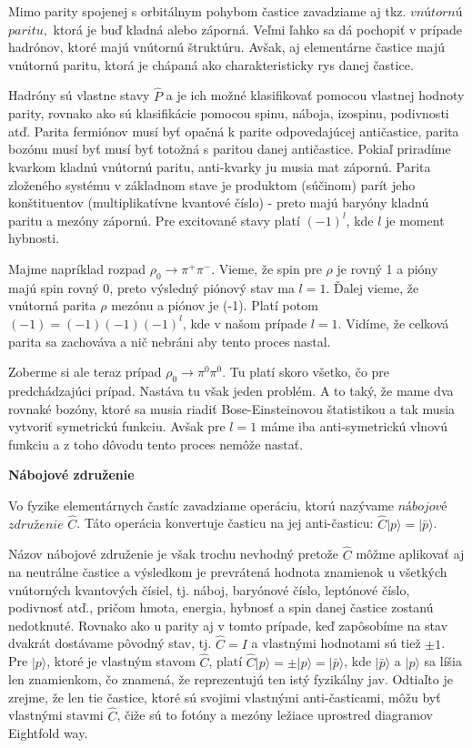 \documentclass[../../main.tex]{subfiles}
\begin{document}
Mimo parity spojenej s orbitálnym pohybom častice zavadziame aj tkz. $vnútornú$ $paritu,$ ktorá je buď kladná alebo záporná. Veľmi ľahko sa dá pochopiť v prípade hadrónov, ktoré majú vnútornú štruktúru. Avšak, aj elementárne častice majú vnútornú paritu, ktorá je chápaná ako charakteristicky rys danej častice.

Hadróny sú vlastne stavy $\hat{P}$ a je ich možné klasifikovať pomocou vlastnej hodnoty parity, rovnako ako sú klasifikácie pomocou spinu, náboja, izospinu, podivnosti atď. Parita fermiónov musí byť opačná k parite odpovedajúcej antičastice, parita bozónu musí byť musí byť totožná s paritou danej antičastice. Pokiaľ priradíme kvarkom kladnú vnútornú paritu, anti-kvarky ju musia mat zápornú. Parita zloženého systému v základnom stave je produktom (súčinom) parít jeho konštituentov (multiplikatívne kvantové číslo) - preto majú baryóny kladnú paritu a mezóny zápornú. Pre excitované stavy platí $(-1)^l$, kde $l$ je moment hybnosti.

Majme napríklad rozpad $\rho_0 \rightarrow \pi^+ \pi^-$. Vieme, že spin pre $\rho$ je rovný 1 a pióny majú spin rovný 0, preto výsledný piónový stav ma $l=1$. Ďalej vieme, že vnútorná parita $\rho$ mezónu a piónov je (-1). Platí potom $(-1)=(-1)(-1)(-1)^l$, kde v našom prípade $l=1$. Vidíme, že celková parita sa zachováva a nič nebráni aby tento proces nastal.
 
Zoberme si ale teraz prípad $\rho_0 \rightarrow \pi^0 \pi^0$. Tu platí skoro všetko, čo pre predchádzajúci prípad. Nastáva tu však jeden problém. A to taký, že mame dva rovnaké bozóny, ktoré sa musia riadiť Bose-Einsteinovou štatistikou a tak musia vytvoriť symetrickú funkciu. Avšak pre $l=1$ máme iba anti-symetrickú vlnovú funkciu a z toho dôvodu tento proces nemôže nastať.
\newline

\textbf{Nábojové združenie}\par
Vo fyzike elementárnych častíc zavadziame operáciu, ktorú nazývame $nábojové$ $združenie$ $\hat{C}$. Táto operácia konvertuje časticu na jej anti-časticu: $\hat{C}\lvert{p}\rangle=\lvert{\bar{p}}\rangle$.

Názov nábojové združenie je však trochu nevhodný pretože $\hat{C}$ môžme aplikovať aj na neutrálne častice a výsledkom je prevrátená hodnota znamienok u všetkých vnútorných kvantových čísiel, tj. náboj, baryónové číslo, leptónové číslo, podivnosť atď., pričom hmota, energia, hybnosť a spin danej častice zostanú nedotknuté. Rovnako ako u parity aj v tomto prípade, keď zapôsobíme na stav dvakrát dostávame pôvodný stav, tj. $\hat{C}=I$ a vlastnými hodnotami sú tiež $\pm1$. Pre $\lvert p\rangle$, ktoré je vlastným stavom $\hat{C}$, platí $\hat{C}\lvert p\rangle = \pm\vert p \rangle=\lvert\bar{p} \rangle$, kde $\lvert\bar{p} \rangle$ a $\lvert p \rangle$ sa líšia len znamienkom, čo znamená, že reprezentujú ten istý fyzikálny jav. Odtiaľto je zrejme, že len tie častice, ktoré sú svojimi vlastnými anti-časticami, môžu byť vlastnými stavmi $\hat{C}$, čiže sú to fotóny a mezóny ležiace uprostred diagramov Eightfold way.
\end{document}
